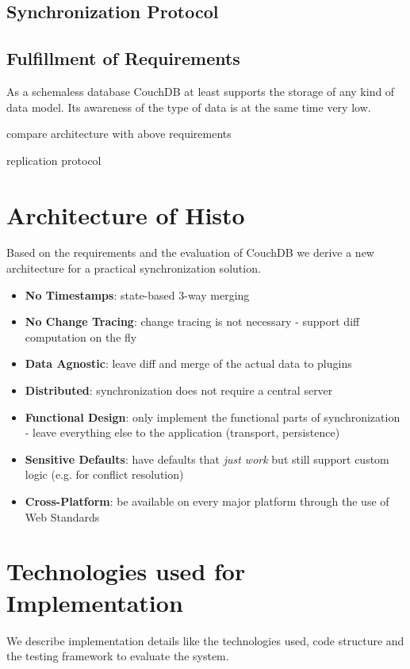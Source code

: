 \subsection{Synchronization Protocol}

\subsection{Fulfillment of Requirements}
As a schemaless database CouchDB at least supports the storage of any kind of data model.
Its awareness of the type of data is at the same time very low.

compare architecture with above requirements

replication protocol

\section{Architecture of Histo}
Based on the requirements and the evaluation of CouchDB we derive a new architecture for a practical synchronization solution.

\begin{itemize}
\item
  \textbf{No Timestamps}: state-based 3-way merging
\item
  \textbf{No Change Tracing}: change tracing is not necessary - support
  diff computation on the fly
\item
  \textbf{Data Agnostic}: leave diff and merge of the actual data to
  plugins
\item
  \textbf{Distributed}: synchronization does not require a central server
\item
  \textbf{Functional Design}: only implement the functional parts of synchronization -
  leave everything else to the application (transport, persistence)
\item
  \textbf{Sensitive Defaults}: have defaults that \emph{just work} but
  still support custom logic (e.g. for conflict resolution)
\item
  \textbf{Cross-Platform}: be available on every major platform through the use of Web Standards
\end{itemize}

\section{Technologies used for Implementation}
We describe implementation details like the technologies used, code structure and the testing framework to evaluate the system.

